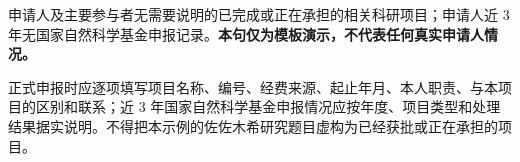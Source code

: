 \GXNSFBodyText

申请人及主要参与者无需要说明的已完成或正在承担的相关科研项目；申请人近 3 年无国家自然科学基金申报记录。\textbf{本句仅为模板演示，不代表任何真实申请人情况。}

正式申报时应逐项填写项目名称、编号、经费来源、起止年月、本人职责、与本项目的区别和联系；近 3 年国家自然科学基金申报情况应按年度、项目类型和处理结果据实说明。不得把本示例的佐佐木希研究题目虚构为已经获批或正在承担的项目。
